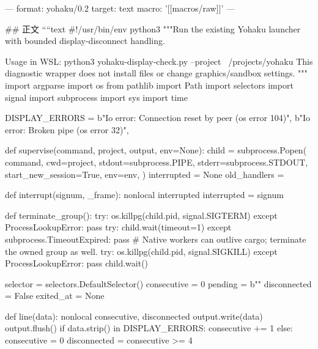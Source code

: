 ---
format: yohaku/0.2
target: text
macro: '[[macros/raw]]'
---

## 正文
````text
#!/usr/bin/env python3
"""Run the existing Yohaku launcher with bounded display-disconnect handling.

Usage in WSL: python3 yohaku-display-check.py --project ~/projects/yohaku
This diagnostic wrapper does not install files or change graphics/sandbox settings.
"""
import argparse
import os
from pathlib import Path
import selectors
import signal
import subprocess
import sys
import time

DISPLAY_ERRORS = {
    b"Io error: Connection reset by peer (os error 104)",
    b"Io error: Broken pipe (os error 32)",
}


def supervise(command, project, output, env=None):
    child = subprocess.Popen(
        command, cwd=project, stdout=subprocess.PIPE,
        stderr=subprocess.STDOUT, start_new_session=True, env=env,
    )
    interrupted = None
    old_handlers = {}

    def interrupt(signum, _frame):
        nonlocal interrupted
        interrupted = signum

    def terminate_group():
        try:
            os.killpg(child.pid, signal.SIGTERM)
        except ProcessLookupError:
            pass
        try:
            child.wait(timeout=1)
        except subprocess.TimeoutExpired:
            pass
        # Native workers can outlive cargo; terminate the owned group as well.
        try:
            os.killpg(child.pid, signal.SIGKILL)
        except ProcessLookupError:
            pass
        child.wait()

    selector = selectors.DefaultSelector()
    consecutive = 0
    pending = b""
    disconnected = False
    exited_at = None

    def line(data):
        nonlocal consecutive, disconnected
        output.write(data)
        output.flush()
        if data.strip() in DISPLAY_ERRORS:
            consecutive += 1
        else:
            consecutive = 0
        disconnected = consecutive >= 4

